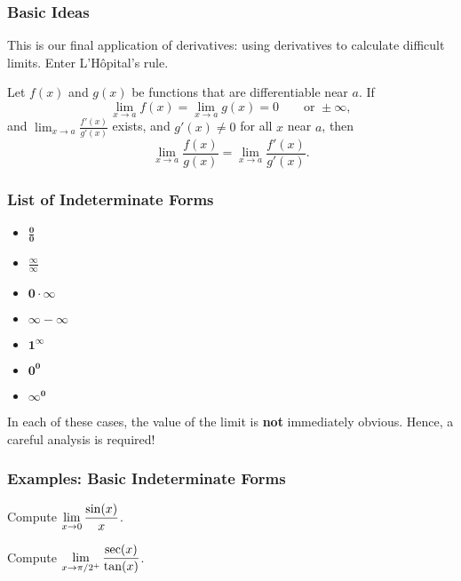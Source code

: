 \documentclass[10pt,t,handout,ignorenonframetext,aspectratio=169]{beamer}
\title[\course]{\lecTitle}
\institute[Ohio State]
{
  \medskip
}
\date[\week]{\semester}
\author{Tae Eun Kim, Ph.D.}
\begin{document}
\begin{frame}
  \titlepage
\end{frame}

\begin{frame}
  \frametitle{Basic Ideas}
  This is our final application of derivatives: using derivatives to
  calculate difficult limits. Enter L'H\^{o}pital's rule.

  \begin{thm}
    Let $f(x)$ and $g(x)$ be functions that are differentiable near $a$.  If
    \[
      \lim_{x \to a} f(x) = \lim_{x \to a}g(x) = 0 \qquad \text{or } \pm \infty,
    \]
    and $\lim_{x \to a} \frac{f'(x)}{g'(x)}$ exists, and $g'(x) \neq 0$
    for all $x$ near $a$, then
    \[
      \lim_{x \to a} \frac{f(x)}{g(x)} = \lim_{x \to a} \frac{f'(x)}{g'(x)}.
    \]
  \end{thm}
\end{frame}


\begin{frame}
  \frametitle{List of Indeterminate Forms}
  \begin{itemize}
  \item $\boldsymbol{\frac{0}{0}}$
  \item $\boldsymbol{\frac{\infty}{\infty}}$
  \item $\boldsymbol{0 \cdot \infty}$
  \item $\boldsymbol{\infty - \infty}$
  \item $\boldsymbol{1^\infty}$
  \item $\boldsymbol{0^0}$
  \item $\boldsymbol{\infty^0}$
  \end{itemize}

  In each of these cases, the value of the limit is \textbf{not} immediately
  obvious. Hence, a careful analysis is required!
\end{frame}


\begin{frame}
  \frametitle{Examples: Basic Indeterminate Forms}
  \begin{question}
    Compute $\displaystyle \lim_{x\to 0} \frac{\sin(x)}{x}$.
  \end{question}
\end{frame}

\begin{frame}
  \vs
  \begin{question}
    Compute $\displaystyle \lim_{x\to \pi/2^+} \frac{\sec(x)}{\tan(x)}$.
  \end{question}
\end{frame}
\end{document}
